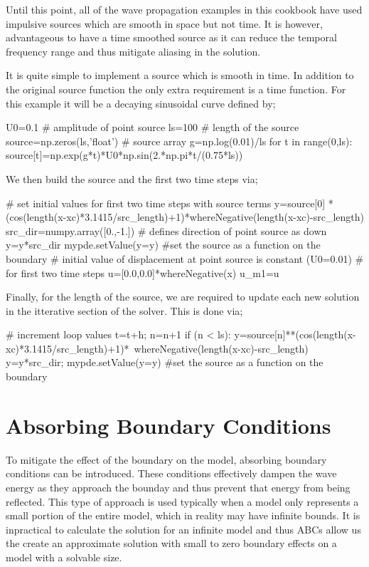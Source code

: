 
Until this point, all of the wave propagation examples in this cookbook have
used impulsive sources which are smooth in space but not time. It is however,
advantageous to have a time smoothed source as it can reduce the temporal
frequency range and thus mitigate aliasing in the solution. 


It is quite 
simple to implement a source which is smooth in time. In addition to the
original source function the only extra requirement is a time function. For
this example it will be a decaying sinusoidal curve defined by;
\begin{python}
U0=0.1 # amplitude of point source
ls=100   # length of the source
source=np.zeros(ls,'float') # source array
g=np.log(0.01)/ls
for t in range(0,ls):
    source[t]=np.exp(g*t)*U0*np.sin(2.*np.pi*t/(0.75*ls))
\end{python}

We then build the source and the first two time steps via;
\begin{python}
# set initial values for first two time steps with source terms
y=source[0]
*(cos(length(x-xc)*3.1415/src_length)+1)*whereNegative(length(x-xc)-src_length)
src_dir=numpy.array([0.,-1.]) # defines direction of point source as down
y=y*src_dir
mypde.setValue(y=y) #set the source as a function on the boundary
# initial value of displacement at point source is constant (U0=0.01)
# for first two time steps
u=[0.0,0.0]*whereNegative(x)
u_m1=u
\end{python}

Finally, for the length of the source, we are required to update each new
solution in the itterative section of the solver. This is done via;
\begin{python}
# increment loop values
t=t+h; n=n+1
if (n < ls):
	y=source[n]**(cos(length(x-xc)*3.1415/src_length)+1)*\
                   whereNegative(length(x-xc)-src_length)
        y=y*src_dir; mypde.setValue(y=y) #set the source as a function on the
boundary
\end{python}

\section{Absorbing Boundary Conditions}
To mitigate the effect of the boundary on the model, absorbing boundary
conditions can be introduced. These conditions effectively dampen the wave
energy as they approach the bounday and thus prevent that energy from being
reflected. This type of approach is used typically when a model only represents
a small portion of the entire model, which in reality may have infinite bounds.
It is inpractical to calculate the solution for an infinite model and thus ABCs
allow us the create an approximate solution with small to zero boundary effects
on a model with a solvable size. 

